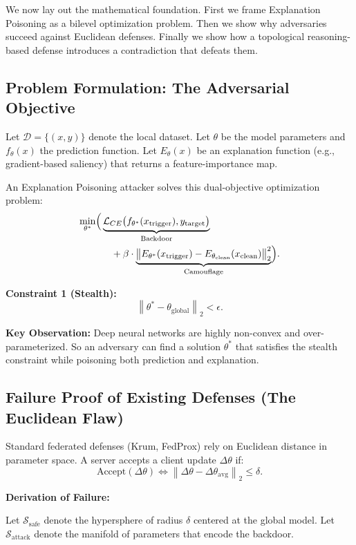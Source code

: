 \documentclass[journal]{IEEEtran}
\begin{document}
We now lay out the mathematical foundation. First we frame Explanation Poisoning as a bilevel optimization problem. Then we show why adversaries succeed against Euclidean defenses. Finally we show how a topological reasoning-based defense introduces a contradiction that defeats them.

\subsection{Problem Formulation: The Adversarial Objective}

Let $\mathcal{D} = \{(x, y)\}$ denote the local dataset. Let $\theta$ be the model parameters and $f_\theta(x)$ the prediction function. Let $E_\theta(x)$ be an explanation function (e.g., gradient-based saliency) that returns a feature-importance map.

An Explanation Poisoning attacker solves this dual-objective optimization problem:
\[
\begin{split}
\min_{\theta^*} \Bigl(
& \underbrace{\mathcal{L}_{CE}\bigl(f_{\theta^*}(x_{\text{trigger}}), y_{\text{target}}\bigr)}_{\text{Backdoor}} \\
& \quad + \beta \cdot
\underbrace{\bigl\| E_{\theta^*}(x_{\text{trigger}}) - E_{\theta_{\text{clean}}}(x_{\text{clean}}) \bigr\|_2^2}_{\text{Camouflage}}
\Bigr). \end{split}
\]

\textbf{Constraint 1 (Stealth):}
\[
\left\| \theta^* - \theta_{\text{global}} \right\|_2 < \epsilon. \]

\textbf{Key Observation:}
Deep neural networks are highly non-convex and over-parameterized. So an adversary can find a solution $\theta^*$ that satisfies the stealth constraint while poisoning both prediction and explanation.

\subsection{Failure Proof of Existing Defenses (The Euclidean Flaw)}

Standard federated defenses (Krum, FedProx) rely on Euclidean distance in parameter space. A server accepts a client update $\Delta \theta$ if:
\[
\text{Accept}(\Delta \theta)
\iff
\left\| \Delta \theta - \Delta \theta_{\text{avg}} \right\|_2 \leq \delta. \]

\textbf{Derivation of Failure:}

Let $\mathcal{S}_{\text{safe}}$ denote the hypersphere of radius $\delta$ centered at the global model. Let $\mathcal{S}_{\text{attack}}$ denote the manifold of parameters that encode the backdoor.
\end{document}
